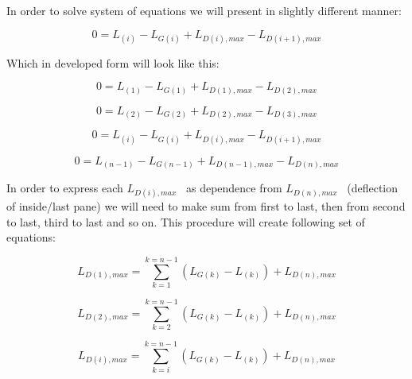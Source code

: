 In order to solve system of equations we will present in slightly different manner:

\begin{equation}
0 = {L_{\left( i \right)}} - {L_{G\left( i \right)}} + {L_{D\left( i \right),max}} - {L_{D\left( {i + 1} \right),max}}
\end{equation}

Which in developed form will look like this:

\begin{equation}
0 = {L_{\left( 1 \right)}} - {L_{G\left( 1 \right)}} + {L_{D\left( 1 \right),max}} - {L_{D\left( 2 \right),max}}
\end{equation}

\begin{equation}
0 = {L_{\left( 2 \right)}} - {L_{G\left( 2 \right)}} + {L_{D\left( 2 \right),max}} - {L_{D\left( 3 \right),max}}
\end{equation}

\begin{equation}
0 = {L_{\left( i \right)}} - {L_{G\left( i \right)}} + {L_{D\left( i \right),max}} - {L_{D\left( {i + 1} \right),max}}
\end{equation}

\begin{equation}
0 = {L_{\left( {n - 1} \right)}} - {L_{G\left( {n - 1} \right)}} + {L_{D\left( {n - 1} \right),max}} - {L_{D\left( n \right),max}}
\end{equation}

In order to express each \({L_{D\left( i \right),max}}\) ~as dependence from \({L_{D\left( n \right),max}}\) ~(deflection of inside/last pane) we will need to make sum from first to last, then from second to last, third to last and so on. This procedure will create following set of equations:

\begin{equation}
{L_{D\left( 1 \right),max}} = \mathop \sum \limits_{k = 1}^{k = n - 1} \left( {{L_{G\left( k \right)}} - {L_{\left( k \right)}}} \right) + {L_{D\left( n \right),max}}
\end{equation}

\begin{equation}
{L_{D\left( 2 \right),max}} = \mathop \sum \limits_{k = 2}^{k = n - 1} \left( {{L_{G\left( k \right)}} - {L_{\left( k \right)}}} \right) + {L_{D\left( n \right),max}}
\end{equation}

\begin{equation}
{L_{D\left( i \right),max}} = \mathop \sum \limits_{k = i}^{k = n - 1} \left( {{L_{G\left( k \right)}} - {L_{\left( k \right)}}} \right) + {L_{D\left( n \right),max}}
\end{equation}

